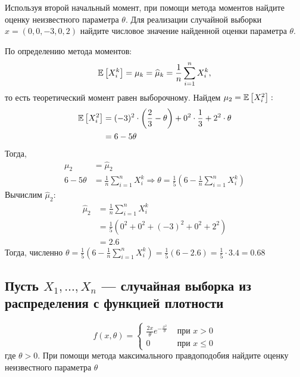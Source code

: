\documentclass{article}
\begin{document}
Используя второй начальный момент, при помощи метода моментов найдите оценку неизвестного параметра $\theta$. Для реализации случайной выборки $x=(0,0,-3,0,2)$ найдите числовое значение найденной оценки параметра $\theta$.

По определению метода моментов:
\begin{equation*}
    \matwait{X_i^k}=\mu_k=\widehat{\mu}_k=\frac{1}{n}\sum_{i=1}^nX_i^k,
\end{equation*}
то есть теоретический момент равен выборочному. Найдем $\mu_2=\mathbb{E}\left[X_i^2\right]:$
\begin{equation*}
    \begin{aligned}
        \mathbb{E}\left[X_i^2\right]&=(-3)^2\cdot\left(\frac{2}{3}-\theta\right)+0^2\cdot\frac{1}{3}+2^2\cdot\theta\\
        &=6-5\theta
    \end{aligned}
\end{equation*}
Тогда,
\begin{equation*}
    \begin{aligned}
        \mu_2&=\widehat{\mu}_2\\
        6-5\theta&=\frac{1}{n}\sum_{i=1}^nX_i^k\Longrightarrow\theta=\frac{1}{5}\left(6-\frac{1}{n}\sum_{i=1}^nX_i^k\right)
    \end{aligned}
\end{equation*}
Вычислим $\widehat{\mu}_2$:
\begin{equation*}
    \begin{aligned}
        \widehat{\mu}_2&=\frac{1}{n}\sum_{i=1}^nX_i^k\\
        &=\frac{1}{5}\left(0^2+0^2+(-3)^2+0^2+2^2\right)\\
        &=2.6
    \end{aligned}
\end{equation*}
Тогда, численно $\theta=\displaystyle\frac{1}{5}\left(6-\frac{1}{n}\sum_{i=1}^nX_i^k\right)=\frac{1}{5}\left(6-2.6\right)=\frac{1}{5}\cdot3.4=0.68$

\subsection{Пусть $X_{1}, \ldots, X_{n}$ — случайная выборка из распределения с функцией плотности}
\begin{equation*}
    f(x, \theta)= \begin{cases}\frac{2 x}{\theta} e^{-\frac{x^{2}}{\theta}} & \text { при } x>0 \\ 0 & \text { при } x \leqslant 0\end{cases}
\end{equation*}
где $\theta>0$. При помощи метода максимального правдоподобия найдите оценку неизвестного параметра $\theta$
\end{document}
